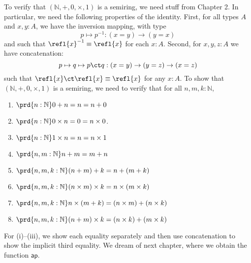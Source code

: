 To verify that $(\mathbb{N}, +, 0, \times, 1)$ is a semiring, we need stuff
from Chapter 2.  In particular, we need the following properties of the
identity.  First, for all types $A$ and $x, y : A$, we have the inversion
mapping, with type
\[
p \mapsto p^{-1} : 
(x = y) \to (y = x)
\]
and such that $\refl{x}^{-1} \equiv \refl{x}$ for each $x : A$.  Second, for
$x, y, z : A$ we have concatenation:
\[
p \mapsto q \mapsto p \ct q
: (x = y) \to (y = z) \to (x = z)
\]
such that $\refl{x} \ct \refl{x} \equiv \refl{x}$ for any $x : A$.  To show
that $(\mathbb{N}, +, 0, \times, 1)$ is a semiring, we need to verify that for
all $n, m, k: \mathbb{N}$,
\begin{enumerate}
\item $\prd{n:\mathbb{N}}0 + n = n = n + 0$
\item $\prd{n:\mathbb{N}}0 \times n = 0 = n \times 0$.
\item $\prd{n:\mathbb{N}}1 \times n = n = n \times 1$
\item $\prd{n,m:\mathbb{N}}n + m = m + n$
\item $\prd{n, m, k:\mathbb{N}}(n+m)+k = n+(m+k)$
\item $\prd{n,m,k:\mathbb{N}}(n \times m) \times k = n \times (m \times k)$
\item $\prd{n,m,k:\mathbb{N}}n \times (m + k) = (n \times m) + (n \times k)$
\item $\prd{n,m,k:\mathbb{N}}(n + m) \times k = (n \times k) + (m \times k)$
\end{enumerate}
For (i)--(iii), we show each equality separately and then use concatenation to
show the implicit third equality.  We dream of next chapter, where we obtain
the function $\mathsf{ap}$.
